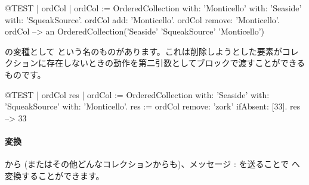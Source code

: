 \documentclass[a4paper,10pt,twoside]{book}
\begin{document}
\begin{code}{@TEST | ordCol | ordCol := OrderedCollection with: 'Monticello' with: 'Seaside' with: 'SqueakSource'.}
ordCol add: 'Monticello'.
ordCol remove: 'Monticello'.
ordCol --> an OrderedCollection('Seaside' 'SqueakSource' 'Monticello')
\end{code}

 の変種として  という名のものがあります。これは削除しようとした要素がコレクションに存在しないときの動作を第二引数としてブロックで渡すことができるものです。

\begin{code}{@TEST | ordCol res | ordCol := OrderedCollection with: 'Seaside' with: 'SqueakSource' with: 'Monticello'.}
res := ordCol remove: 'zork' ifAbsent: [33].
res --> 33
\end{code}

\paragraph{変換}
 から (またはその他どんなコレクションからも)、メッセージ : を送ることで  へ変換することができます。




\end{document}
